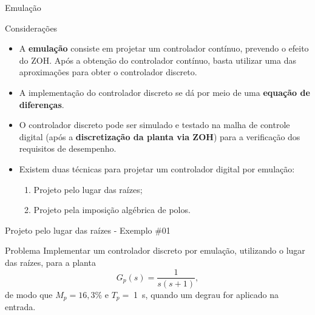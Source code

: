 \begin{frame}{Emulação}
\begin{block}{Considerações}
\begin{itemize}
    \item A \textbf{emulação} consiste em projetar um controlador contínuo, prevendo o efeito do ZOH. Após a obtenção do controlador contínuo, basta utilizar uma das aproximações para obter o controlador discreto.
    \item A implementação do controlador discreto se dá por meio de uma \textbf{equação de diferenças}.
    \item O controlador discreto pode ser simulado e testado na malha de controle digital (após a \textbf{discretização da planta via ZOH}) para a verificação dos requisitos de desempenho.
    \item Existem duas técnicas para projetar um controlador digital por emulação:
    \begin{enumerate}
        \item Projeto pelo lugar das raízes;
        \item Projeto pela imposição algébrica de polos.
    \end{enumerate}
\end{itemize}
\end{block}
\end{frame}

\begin{frame}{Projeto pelo lugar das raízes - Exemplo \#01}
\begin{block}{Problema}
	Implementar um controlador discreto por emulação, utilizando o lugar das raízes, para a planta
	$$ G_p(s)=\dfrac{1}{s(s+1)}, $$
	de modo que $ M_p=16,3\% $ e $ T_p=\; $\SI{1}{\second}, quando um degrau for aplicado na entrada.
\end{block}
\end{frame}


